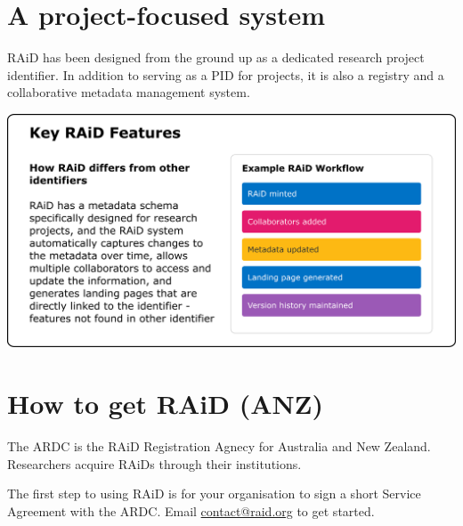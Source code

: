 \documentclass[a0,portrait]{a0poster}
\newenvironment{Figure}
  {\par\medskip\noindent\minipage{\linewidth}}
  {\endminipage\par\medskip}
\begin{document}
\begin{multicols}{3}

\color{ARDCPurple}
\section*{\LARGE A project-focused system}
\color{DarkGrey}
\large{
RAiD has been designed from the ground up as a dedicated research project identifier. In addition to serving as a PID for projects, it is also a registry and a collaborative metadata management system.
}

\begin{Figure}
  \centering
  \includegraphics[width=0.9\linewidth]{figures/raid-key-features.png}
  \label{key-features}
\end{Figure}


\vspace{-1cm}

\color{ARDCBlue}
\section*{\LARGE How to get RAiD (ANZ)}
\color{DarkGrey}
\large{
The ARDC is the RAiD Registration Agnecy for Australia and New Zealand. Researchers acquire RAiDs through their institutions. 

The first step to using RAiD is for your organisation to sign a short Service Agreement with the ARDC. Email \href{mailto:contact@raid.org}{contact@raid.org} to get started.
}


\end{multicols}
\end{document}
